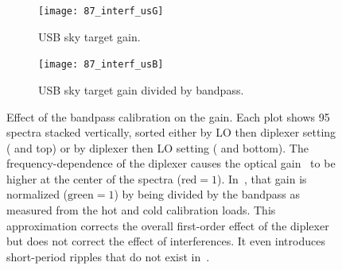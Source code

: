 \begin{figure}
    \begin{subfigure}[t]{\linewidth}
        \texttt{[image: 87\_interf\_usG]}
        \begin{minipage}{.82\linewidth}%
            \caption{USB sky target gain.}
            \label{fig:87_interf_usG}
        \end{minipage}
    \end{subfigure}%

    \begin{subfigure}[t]{\linewidth}
        \texttt{[image: 87\_interf\_usB]}
        \begin{minipage}{.82\linewidth}%
            \caption{USB sky target gain divided by bandpass.}
            \label{fig:87_interf_usB}
        \end{minipage}
    \end{subfigure}%

    \caption{
        Effect of the bandpass calibration on the gain.
        Each plot shows 95  spectra stacked vertically, sorted
        either by LO then diplexer setting
            ( and
              top)
        or     by diplexer then LO setting
            ( and
              bottom).
        The frequency-dependence of the diplexer causes the
        optical gain~ to be higher at the center of the
        spectra
        ($\text{red}=1$).
        In~, that gain is normalized
        ($\text{green}=1$)
        by being divided by the bandpass as measured from the hot and cold calibration
        loads.
        This approximation corrects the overall first-order effect of the diplexer but
        does not correct the effect of interferences.
        It even introduces short-period ripples that do not exist in~.
    }
    \label{fig:87_interf_usGusB}
\end{figure}

